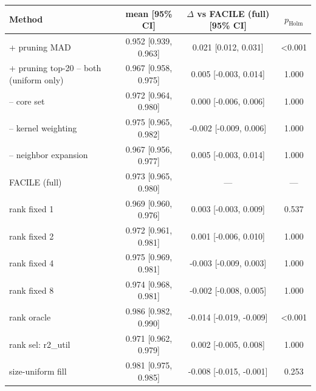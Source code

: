 \begin{tabular}{lccc}
\toprule
Method & mean [95\% CI] & $\Delta$ vs FACILE (full) [95\% CI] & $p_{\mathrm{Holm}}$ \\
\midrule
+ pruning MAD & 0.952 [0.939, 0.963] & 0.021 [0.012, 0.031] & <0.001 \\
+ pruning top-20%
-- both (uniform only) & 0.967 [0.958, 0.975] & 0.005 [-0.003, 0.014] & 1.000 \\
-- core set & 0.972 [0.964, 0.980] & 0.000 [-0.006, 0.006] & 1.000 \\
-- kernel weighting & 0.975 [0.965, 0.982] & -0.002 [-0.009, 0.006] & 1.000 \\
-- neighbor expansion & 0.967 [0.956, 0.977] & 0.005 [-0.003, 0.014] & 1.000 \\
FACILE (full) & 0.973 [0.965, 0.980] & --- & --- \\
rank fixed 1 & 0.969 [0.960, 0.976] & 0.003 [-0.003, 0.009] & 0.537 \\
rank fixed 2 & 0.972 [0.961, 0.981] & 0.001 [-0.006, 0.010] & 1.000 \\
rank fixed 4 & 0.975 [0.969, 0.981] & -0.003 [-0.009, 0.003] & 1.000 \\
rank fixed 8 & 0.974 [0.968, 0.981] & -0.002 [-0.008, 0.005] & 1.000 \\
rank oracle & 0.986 [0.982, 0.990] & -0.014 [-0.019, -0.009] & <0.001 \\
rank sel: r2_util & 0.971 [0.962, 0.979] & 0.002 [-0.005, 0.008] & 1.000 \\
size-uniform fill & 0.981 [0.975, 0.985] & -0.008 [-0.015, -0.001] & 0.253 \\
\bottomrule
\end{tabular}

